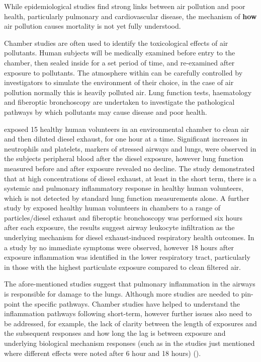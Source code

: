 
While epidemiological studies find strong links between air pollution and poor health, particularly pulmonary and cardiovascular disease, the mechanism of \textbf{how} air pollution causes mortality is not yet fully understood. 


Chamber studies are often used to identify the toxicological effects of air pollutants. Human subjects will be medically examined before entry to the chamber, then sealed inside for a set period of time, and re-examined after exposure to pollutants. The atmosphere within can be carefully controlled by investigators to simulate the environment of their choice, in the case of air pollution normally this is heavily polluted air. Lung function tests, haematology and fiberoptic bronchoscopy are undertaken to investigate the pathological pathways by which pollutants may cause disease and poor health.

\cite{Salvi1999} exposed 15 healthy human volunteers in an environmental chamber to  clean air and then diluted diesel exhaust, for one hour at a time. Significant increases in neutrophils and platelets, markers of stressed airways and lungs, were observed in the subjects peripheral blood after the diesel exposure, however lung function measured before and after exposure revealed no decline. The study demonstrated that at high concentrations of diesel exhaust, at least in the short term, there is a systemic and pulmonary inflammatory response in healthy human volunteers, which is not detected by standard lung function measurements alone. A further study by \cite{Salvi2000} exposed healthy human volunteers in chambers to a range of particles/diesel exhaust and fiberoptic bronchoscopy was performed six hours after each exposure, the results suggest airway leukocyte infiltration as the underlying mechanism for diesel exhaust-induced respiratory health outcomes. In a study by \cite{Ghio2000} no immediate symptoms were observed, however 18 hours after exposure inflammation was identified in the lower respiratory tract, particularly in those with the highest particulate exposure compared to clean filtered air.

The afore-mentioned studies suggest that pulmonary inflammation in the airways is responsible for damage to the lungs. Although more studies are needed to pin-point the specific pathways. Chamber studies have helped to understand the inflammation pathways following short-term, however further issues also need to be addressed, for example, the lack of clarity between the length of exposures and the subsequent responses and how long the lag is between exposure and underlying biological mechanism responses (such as in the studies just mentioned where different effects were noted after 6 hour and 18 hours) (\cite{EnvironmentalProtectionAgency2009}).

